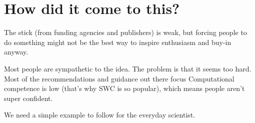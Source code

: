 \section{How did it come to this?}

The stick (from funding agencies and publishers) is weak, but forcing people to do something might not be the best way to inspire enthusiasm and buy-in anyway. 

Most people are sympathetic to the idea. The problem is that it seems too hard. Most of the recommendations and guidance out there focus 
Computational competence is low (that's why SWC is so popular), which means people aren't super confident. 

We need a simple example to follow for the everyday scientist.